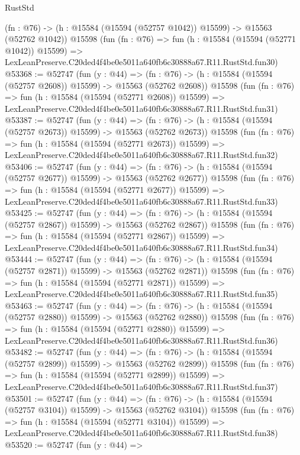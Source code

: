 \begin{lexlean}{RustStd}
\begin{coremodule}
    (fn : @76) -> (h : @15584 (@15594 (@52757 @1042)) @15599) -> @15563 (@52762 @1042))
    @15598
    (fun (fn : @76) =>
    fun (h : @15584 (@15594 (@52771 @1042)) @15599) =>
    LexLeanPreserve.C20ded4f4be0e5011a640fb6c30888a67.R11.RustStd.fun30)
@53368 := @52747
    (fun (y : @44) =>
    (fn : @76) -> (h : @15584 (@15594 (@52757 @2608)) @15599) -> @15563 (@52762 @2608))
    @15598
    (fun (fn : @76) =>
    fun (h : @15584 (@15594 (@52771 @2608)) @15599) =>
    LexLeanPreserve.C20ded4f4be0e5011a640fb6c30888a67.R11.RustStd.fun31)
@53387 := @52747
    (fun (y : @44) =>
    (fn : @76) -> (h : @15584 (@15594 (@52757 @2673)) @15599) -> @15563 (@52762 @2673))
    @15598
    (fun (fn : @76) =>
    fun (h : @15584 (@15594 (@52771 @2673)) @15599) =>
    LexLeanPreserve.C20ded4f4be0e5011a640fb6c30888a67.R11.RustStd.fun32)
@53406 := @52747
    (fun (y : @44) =>
    (fn : @76) -> (h : @15584 (@15594 (@52757 @2677)) @15599) -> @15563 (@52762 @2677))
    @15598
    (fun (fn : @76) =>
    fun (h : @15584 (@15594 (@52771 @2677)) @15599) =>
    LexLeanPreserve.C20ded4f4be0e5011a640fb6c30888a67.R11.RustStd.fun33)
@53425 := @52747
    (fun (y : @44) =>
    (fn : @76) -> (h : @15584 (@15594 (@52757 @2867)) @15599) -> @15563 (@52762 @2867))
    @15598
    (fun (fn : @76) =>
    fun (h : @15584 (@15594 (@52771 @2867)) @15599) =>
    LexLeanPreserve.C20ded4f4be0e5011a640fb6c30888a67.R11.RustStd.fun34)
@53444 := @52747
    (fun (y : @44) =>
    (fn : @76) -> (h : @15584 (@15594 (@52757 @2871)) @15599) -> @15563 (@52762 @2871))
    @15598
    (fun (fn : @76) =>
    fun (h : @15584 (@15594 (@52771 @2871)) @15599) =>
    LexLeanPreserve.C20ded4f4be0e5011a640fb6c30888a67.R11.RustStd.fun35)
@53463 := @52747
    (fun (y : @44) =>
    (fn : @76) -> (h : @15584 (@15594 (@52757 @2880)) @15599) -> @15563 (@52762 @2880))
    @15598
    (fun (fn : @76) =>
    fun (h : @15584 (@15594 (@52771 @2880)) @15599) =>
    LexLeanPreserve.C20ded4f4be0e5011a640fb6c30888a67.R11.RustStd.fun36)
@53482 := @52747
    (fun (y : @44) =>
    (fn : @76) -> (h : @15584 (@15594 (@52757 @2899)) @15599) -> @15563 (@52762 @2899))
    @15598
    (fun (fn : @76) =>
    fun (h : @15584 (@15594 (@52771 @2899)) @15599) =>
    LexLeanPreserve.C20ded4f4be0e5011a640fb6c30888a67.R11.RustStd.fun37)
@53501 := @52747
    (fun (y : @44) =>
    (fn : @76) -> (h : @15584 (@15594 (@52757 @3104)) @15599) -> @15563 (@52762 @3104))
    @15598
    (fun (fn : @76) =>
    fun (h : @15584 (@15594 (@52771 @3104)) @15599) =>
    LexLeanPreserve.C20ded4f4be0e5011a640fb6c30888a67.R11.RustStd.fun38)
@53520 := @52747
    (fun (y : @44) =>

\end{coremodule}
\end{lexlean}
